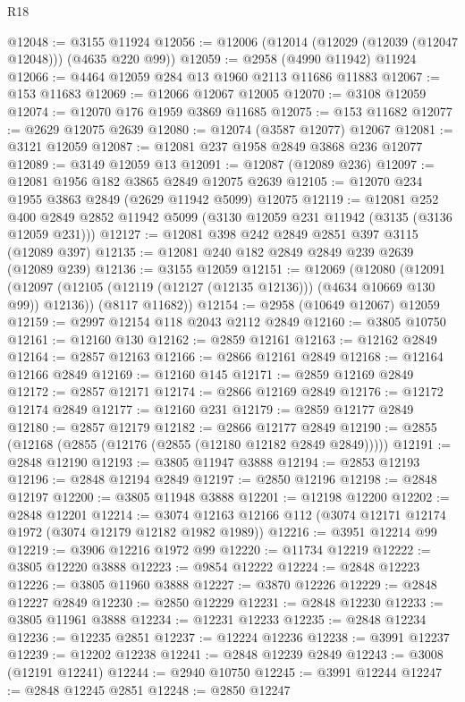 \begin{lexlean}{R18}
\begin{coremodule}
@12048 := @3155 @11924
@12056 := @12006 (@12014 (@12029 (@12039 (@12047 @12048))) (@4635 @220 @99))
@12059 := @2958 (@4990 @11942) @11924
@12066 := @4464 @12059 @284 @13 @1960 @2113 @11686 @11883
@12067 := @153 @11683
@12069 := @12066 @12067 @12005
@12070 := @3108 @12059
@12074 := @12070 @176 @1959 @3869 @11685
@12075 := @153 @11682
@12077 := @2629 @12075 @2639
@12080 := @12074 (@3587 @12077) @12067
@12081 := @3121 @12059
@12087 := @12081 @237 @1958 @2849 @3868 @236 @12077
@12089 := @3149 @12059 @13
@12091 := @12087 (@12089 @236)
@12097 := @12081 @1956 @182 @3865 @2849 @12075 @2639
@12105 := @12070 @234 @1955 @3863 @2849 (@2629 @11942 @5099) @12075
@12119 := @12081
    @252
    @400
    @2849
    @2852
    @11942
    @5099
    (@3130 @12059 @231 @11942 (@3135 (@3136 @12059 @231)))
@12127 := @12081 @398 @242 @2849 @2851 @397 @3115 (@12089 @397)
@12135 := @12081 @240 @182 @2849 @2849 @239 @2639 (@12089 @239)
@12136 := @3155 @12059
@12151 := @12069
    (@12080
      (@12091 (@12097 (@12105 (@12119 (@12127 (@12135 @12136))) (@4634 @10669 @130 @99)) @12136))
      (@8117 @11682))
@12154 := @2958 (@10649 @12067) @12059
@12159 := @2997 @12154 @118 @2043 @2112 @2849
@12160 := @3805 @10750
@12161 := @12160 @130
@12162 := @2859 @12161
@12163 := @12162 @2849
@12164 := @2857 @12163
@12166 := @2866 @12161 @2849
@12168 := @12164 @12166 @2849
@12169 := @12160 @145
@12171 := @2859 @12169 @2849
@12172 := @2857 @12171
@12174 := @2866 @12169 @2849
@12176 := @12172 @12174 @2849
@12177 := @12160 @231
@12179 := @2859 @12177 @2849
@12180 := @2857 @12179
@12182 := @2866 @12177 @2849
@12190 := @2855 (@12168 (@2855 (@12176 (@2855 (@12180 @12182 @2849 @2849)))))
@12191 := @2848 @12190
@12193 := @3805 @11947 @3888
@12194 := @2853 @12193
@12196 := @2848 @12194 @2849
@12197 := @2850 @12196
@12198 := @2848 @12197
@12200 := @3805 @11948 @3888
@12201 := @12198 @12200
@12202 := @2848 @12201
@12214 := @3074 @12163 @12166 @112 (@3074 @12171 @12174 @1972 (@3074 @12179 @12182 @1982 @1989))
@12216 := @3951 @12214 @99
@12219 := @3906 @12216 @1972 @99
@12220 := @11734 @12219
@12222 := @3805 @12220 @3888
@12223 := @9854 @12222
@12224 := @2848 @12223
@12226 := @3805 @11960 @3888
@12227 := @3870 @12226
@12229 := @2848 @12227 @2849
@12230 := @2850 @12229
@12231 := @2848 @12230
@12233 := @3805 @11961 @3888
@12234 := @12231 @12233
@12235 := @2848 @12234
@12236 := @12235 @2851
@12237 := @12224 @12236
@12238 := @3991 @12237
@12239 := @12202 @12238
@12241 := @2848 @12239 @2849
@12243 := @3008 (@12191 @12241)
@12244 := @2940 @10750
@12245 := @3991 @12244
@12247 := @2848 @12245 @2851
@12248 := @2850 @12247

\end{coremodule}
\end{lexlean}
